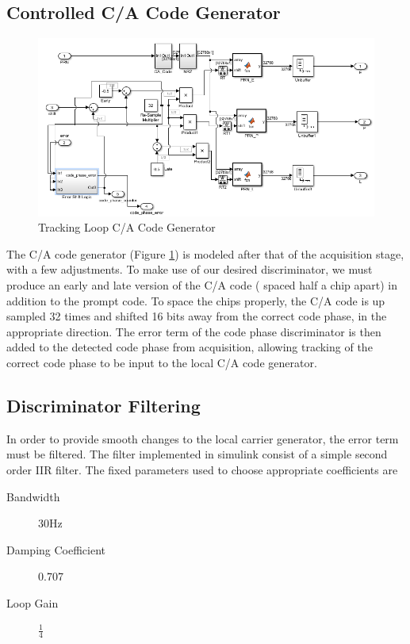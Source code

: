 \documentclass[11pt]{article}
\numberwithin{equation}{subsection}
\begin{document}
	\subsection{Controlled C/A Code Generator}
	\begin{figure}
		\centering
		\includegraphics[width=\textwidth]{Tracking_CA_Code}
		
		\caption{Tracking Loop C/A Code Generator}
		\label{TCA}
	\end{figure}
	The C/A code generator (Figure \ref{TCA}) is modeled after that of the acquisition stage, with a few adjustments. To make use of our desired discriminator, we must produce an early and late version of the C/A code ( spaced half a chip apart) in addition to the prompt code. To space the chips properly, the C/A code is up sampled 32 times and shifted 16 bits away from the correct code phase, in the appropriate direction. The error term of the code phase discriminator is then added to the detected code phase from acquisition, allowing tracking of the correct code phase to be input to the local C/A code generator.
	
	\subsection{Discriminator Filtering}
	
	In order to provide smooth changes to the local carrier generator, the error term must be filtered. The filter implemented in simulink consist of a simple second order IIR filter. The fixed parameters used to choose appropriate coefficients are
	
	\begin{description}
		\item[Bandwidth] 30Hz	
		\item[Damping Coefficient] 0.707
		\item[Loop Gain] $\frac{1}{4}$		
	\end{description}
	
\end{document}
